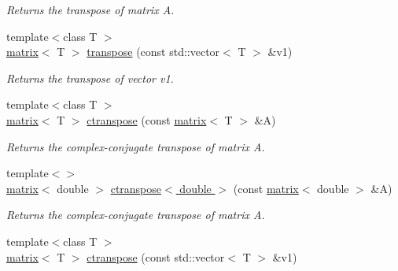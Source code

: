 \begin{DoxyCompactItemize}
\begin{DoxyCompactList}\small\item\em Returns the transpose of matrix A. \end{DoxyCompactList}\item 
\hypertarget{namespacekeycpp_a0a72326529750cf63cf05afa6fa15a65}{{\footnotesize template$<$class T $>$ }\\\hyperlink{classkeycpp_1_1matrix}{matrix}$<$ T $>$ \hyperlink{namespacekeycpp_a0a72326529750cf63cf05afa6fa15a65}{transpose} (const std\-::vector$<$ T $>$ \&v1)}\label{namespacekeycpp_a0a72326529750cf63cf05afa6fa15a65}

\begin{DoxyCompactList}\small\item\em Returns the transpose of vector v1. \end{DoxyCompactList}\item 
\hypertarget{namespacekeycpp_a14503c0419f365433d88fa081d473210}{{\footnotesize template$<$class T $>$ }\\\hyperlink{classkeycpp_1_1matrix}{matrix}$<$ T $>$ \hyperlink{namespacekeycpp_a14503c0419f365433d88fa081d473210}{ctranspose} (const \hyperlink{classkeycpp_1_1matrix}{matrix}$<$ T $>$ \&A)}\label{namespacekeycpp_a14503c0419f365433d88fa081d473210}

\begin{DoxyCompactList}\small\item\em Returns the complex-\/conjugate transpose of matrix A. \end{DoxyCompactList}\item 
\hypertarget{namespacekeycpp_a9fc1e2c9bf6ee79ee28a6f25b7b55b23}{{\footnotesize template$<$$>$ }\\\hyperlink{classkeycpp_1_1matrix}{matrix}$<$ double $>$ \hyperlink{namespacekeycpp_a9fc1e2c9bf6ee79ee28a6f25b7b55b23}{ctranspose$<$ double $>$} (const \hyperlink{classkeycpp_1_1matrix}{matrix}$<$ double $>$ \&A)}\label{namespacekeycpp_a9fc1e2c9bf6ee79ee28a6f25b7b55b23}

\begin{DoxyCompactList}\small\item\em Returns the complex-\/conjugate transpose of matrix A. \end{DoxyCompactList}\item 
\hypertarget{namespacekeycpp_ad276b8edd0f4f62b430620047245d18d}{{\footnotesize template$<$class T $>$ }\\\hyperlink{classkeycpp_1_1matrix}{matrix}$<$ T $>$ \hyperlink{namespacekeycpp_ad276b8edd0f4f62b430620047245d18d}{ctranspose} (const std\-::vector$<$ T $>$ \&v1)}\label{namespacekeycpp_ad276b8edd0f4f62b430620047245d18d}


\end{DoxyCompactItemize}
